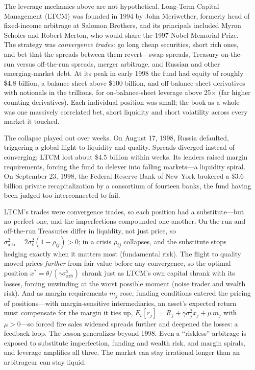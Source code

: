 The leverage mechanics above are not hypothetical. Long-Term Capital Management (LTCM) was founded in 1994 by John Meriwether, formerly head of fixed-income arbitrage at Salomon Brothers, and its principals included Myron Scholes and Robert Merton, who would share the 1997 Nobel Memorial Prize. The strategy was \emph{convergence trades}: go long cheap securities, short rich ones, and bet that the spreads between them revert---swap spreads, Treasury on-the-run versus off-the-run spreads, merger arbitrage, and Russian and other emerging-market debt. At its peak in early 1998 the fund had equity of roughly \$4.8 billion, a balance sheet above \$100 billion, and off-balance-sheet derivatives with notionals in the trillions, for on-balance-sheet leverage above 25$\times$ (far higher counting derivatives). Each individual position was small; the book as a whole was one massively correlated bet, short liquidity and short volatility across every market it touched.

The collapse played out over weeks. On August 17, 1998, Russia defaulted, triggering a global flight to liquidity and quality. Spreads diverged instead of converging; LTCM lost about \$4.5 billion within weeks. Its lenders raised margin requirements, forcing the fund to delever into falling markets---a liquidity spiral. On September 23, 1998, the Federal Reserve Bank of New York brokered a \$3.6 billion private recapitalization by a consortium of fourteen banks, the fund having been judged too interconnected to fail.

LTCM's trades were convergence trades, so each position had a substitute---but no perfect one, and the imperfections compounded one another. On-the-run and off-the-run Treasuries differ in liquidity, not just price, so $\sigma^2_{\mathrm{arb}} = 2\sigma_\varepsilon^2(1-\rho_{ij}) > 0$; in a crisis $\rho_{ij}$ collapses, and the substitute stops hedging exactly when it matters most (fundamental risk). The flight to quality moved prices \emph{further} from fair value before any convergence, so the optimal position $x^{*} = \theta/(\gamma\sigma^2_{\mathrm{arb}})$ shrank just as LTCM's own capital shrank with its losses, forcing unwinding at the worst possible moment (noise trader and wealth risk). And as margin requirements $m_j$ rose, funding conditions entered the pricing of positions---with margin-sensitive intermediaries, an asset's expected return must compensate for the margin it ties up, $E_t[r_j] = R_f + \gamma\sigma_j^2 x_j + \mu\, m_j$ with $\mu > 0$---so forced fire sales widened spreads further and deepened the losses: a feedback loop. The lesson generalizes beyond 1998. Even a ``riskless'' arbitrage is exposed to substitute imperfection, funding and wealth risk, and margin spirals, and leverage amplifies all three. The market can stay irrational longer than an arbitrageur can stay liquid.

